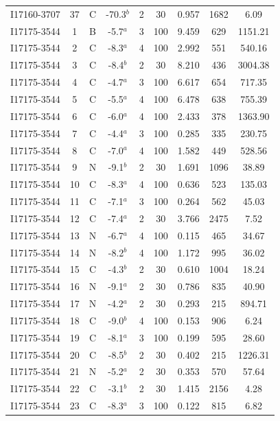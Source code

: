 \begin{table}
\begin{tabular}{ccccccccc}
I17160-3707 & 37 & C & -70.3$^{b}$ & 2 & 30 & 0.957 & 1682 & 6.09 \\
I17175-3544 & 1 & B & -5.7$^{a}$ & 3 & 100 & 9.459 & 629 & 1151.21 \\
I17175-3544 & 2 & C & -8.3$^{a}$ & 4 & 100 & 2.992 & 551 & 540.16 \\
I17175-3544 & 3 & C & -8.4$^{b}$ & 2 & 30 & 8.210 & 436 & 3004.38 \\
I17175-3544 & 4 & C & -4.7$^{a}$ & 3 & 100 & 6.617 & 654 & 717.35 \\
I17175-3544 & 5 & C & -5.5$^{a}$ & 4 & 100 & 6.478 & 638 & 755.39 \\
I17175-3544 & 6 & C & -6.0$^{a}$ & 4 & 100 & 2.433 & 378 & 1363.90 \\
I17175-3544 & 7 & C & -4.4$^{a}$ & 3 & 100 & 0.285 & 335 & 230.75 \\
I17175-3544 & 8 & C & -7.0$^{a}$ & 4 & 100 & 1.582 & 449 & 528.56 \\
I17175-3544 & 9 & N & -9.1$^{b}$ & 2 & 30 & 1.691 & 1096 & 38.89 \\
I17175-3544 & 10 & C & -8.3$^{a}$ & 4 & 100 & 0.636 & 523 & 135.03 \\
I17175-3544 & 11 & C & -7.1$^{a}$ & 3 & 100 & 0.264 & 562 & 45.03 \\
I17175-3544 & 12 & C & -7.4$^{a}$ & 2 & 30 & 3.766 & 2475 & 7.52 \\
I17175-3544 & 13 & N & -6.7$^{a}$ & 4 & 100 & 0.115 & 465 & 34.67 \\
I17175-3544 & 14 & N & -8.2$^{b}$ & 4 & 100 & 1.172 & 995 & 36.02 \\
I17175-3544 & 15 & C & -4.3$^{b}$ & 2 & 30 & 0.610 & 1004 & 18.24 \\
I17175-3544 & 16 & N & -9.1$^{a}$ & 2 & 30 & 0.786 & 835 & 40.90 \\
I17175-3544 & 17 & N & -4.2$^{a}$ & 2 & 30 & 0.293 & 215 & 894.71 \\
I17175-3544 & 18 & C & -9.0$^{b}$ & 4 & 100 & 0.153 & 906 & 6.24 \\
I17175-3544 & 19 & C & -8.1$^{a}$ & 3 & 100 & 0.199 & 595 & 28.60 \\
I17175-3544 & 20 & C & -8.5$^{b}$ & 2 & 30 & 0.402 & 215 & 1226.31 \\
I17175-3544 & 21 & N & -5.2$^{a}$ & 2 & 30 & 0.353 & 570 & 57.64 \\
I17175-3544 & 22 & C & -3.1$^{b}$ & 2 & 30 & 1.415 & 2156 & 4.28 \\
I17175-3544 & 23 & C & -8.3$^{a}$ & 3 & 100 & 0.122 & 815 & 6.82 \\

\end{tabular}
\end{table}
